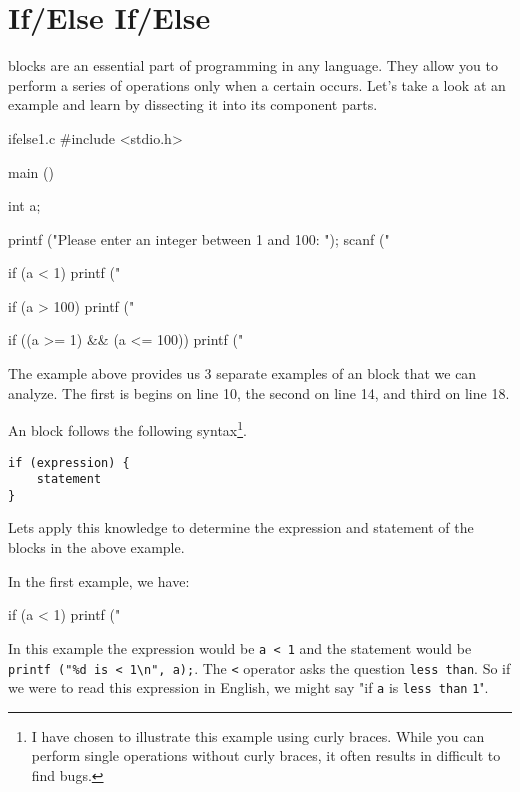 \chapter{If/Else If/Else}

 blocks are an essential part of programming in any language. They
allow you to perform a series of operations only when a certain
 occurs. Let's take a look at an example and learn by
dissecting it into its component parts.

\begin{code}{ifelse1.c}
#include <stdio.h>

main ()
{
    int a;

    printf ("Please enter an integer between 1 and 100:  ");
    scanf ("%

    if (a < 1) {
        printf ("%
    }

    if (a > 100) {
        printf ("%
    }

    if ((a >= 1) && (a <= 100)) {
        printf ("%
    }
}
\end{code}

The example above provides us 3 separate examples of an  block that
we can analyze. The first is begins on line 10, the second on line 14, and third
on line 18.

An  block follows the following syntax\footnote{I have chosen to
illustrate this example using curly braces. While you can perform single
operations without curly braces, it often results in difficult to find bugs.}.

\begin{Verbatim}
if (expression) {
    statement
}
\end{Verbatim}

Lets apply this knowledge to determine the expression and statement of the
 blocks in the above example.

In the first example, we have:

\begin{code}{}
if (a < 1) {
    printf ("%
}
\end{code}

In this example the expression would be \verb|a < 1| and the statement
would be \verb|printf ("%d is < 1\n", a);|. The \verb|<| operator asks the
question \verb|less than|. So if we were to read this expression in English,
we might say "if \verb|a| is \verb|less than| \verb|1|".

